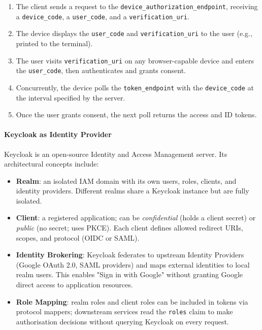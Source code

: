\begin{enumerate}
    \item The client sends a request to the \texttt{device\_authorization\_endpoint}, receiving a \texttt{device\_code}, a \texttt{user\_code}, and a \texttt{verification\_uri}.
    \item The device displays the \texttt{user\_code} and \texttt{verification\_uri} to the user (e.g., printed to the terminal).
    \item The user visits \texttt{verification\_uri} on any browser-capable device and enters the \texttt{user\_code}, then authenticates and grants consent.
    \item Concurrently, the device polls the \texttt{token\_endpoint} with the \texttt{device\_code} at the interval specified by the server.
    \item Once the user grants consent, the next poll returns the access and ID tokens.
\end{enumerate}

\paragraph{Keycloak as Identity Provider}

Keycloak is an open-source Identity and Access Management server. Its architectural concepts include:
\begin{itemize}
    \item \textbf{Realm}: an isolated IAM domain with its own users, roles, clients, and identity providers. Different realms share a Keycloak instance but are fully isolated.
    \item \textbf{Client}: a registered application; can be \emph{confidential} (holds a client secret) or \emph{public} (no secret; uses PKCE). Each client defines allowed redirect URIs, scopes, and protocol (OIDC or SAML).
    \item \textbf{Identity Brokering}: Keycloak federates to upstream Identity Providers (Google OAuth 2.0, SAML providers) and maps external identities to local realm users. This enables "Sign in with Google" without granting Google direct access to application resources.
    \item \textbf{Role Mapping}: realm roles and client roles can be included in tokens via protocol mappers; downstream services read the \texttt{roles} claim to make authorisation decisions without querying Keycloak on every request.
\end{itemize}

